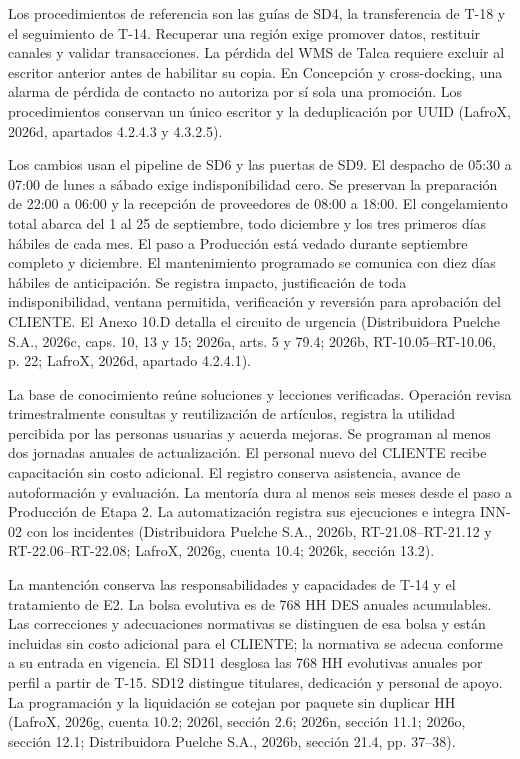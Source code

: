 Los procedimientos de referencia son las guías de SD4, la transferencia de T-18 y el seguimiento de T-14. Recuperar una región exige promover datos, restituir canales y validar transacciones. La pérdida del WMS de Talca requiere excluir al escritor anterior antes de habilitar su copia. En Concepción y cross-docking, una alarma de pérdida de contacto no autoriza por sí sola una promoción. Los procedimientos conservan un único escritor y la deduplicación por UUID (LafroX, 2026d, apartados 4.2.4.3 y 4.3.2.5).

Los cambios usan el pipeline de SD6 y las puertas de SD9. El despacho de 05:30 a 07:00 de lunes a sábado exige indisponibilidad cero. Se preservan la preparación de 22:00 a 06:00 y la recepción de proveedores de 08:00 a 18:00. El congelamiento total abarca del 1 al 25 de septiembre, todo diciembre y los tres primeros días hábiles de cada mes. El paso a Producción está vedado durante septiembre completo y diciembre. El mantenimiento programado se comunica con diez días hábiles de anticipación. Se registra impacto, justificación de toda indisponibilidad, ventana permitida, verificación y reversión para aprobación del CLIENTE. El Anexo 10.D detalla el circuito de urgencia (Distribuidora Puelche S.A., 2026c, caps. 10, 13 y 15; 2026a, arts. 5 y 79.4; 2026b, RT-10.05--RT-10.06, p. 22; LafroX, 2026d, apartado 4.2.4.1).

La base de conocimiento reúne soluciones y lecciones verificadas. Operación revisa trimestralmente consultas y reutilización de artículos, registra la utilidad percibida por las personas usuarias y acuerda mejoras. Se programan al menos dos jornadas anuales de actualización. El personal nuevo del CLIENTE recibe capacitación sin costo adicional. El registro conserva asistencia, avance de autoformación y evaluación. La mentoría dura al menos seis meses desde el paso a Producción de Etapa 2. La automatización registra sus ejecuciones e integra INN-02 con los incidentes (Distribuidora Puelche S.A., 2026b, RT-21.08--RT-21.12 y RT-22.06--RT-22.08; LafroX, 2026g, cuenta 10.4; 2026k, sección 13.2).

La mantención conserva las responsabilidades y capacidades de T-14 y el tratamiento de E2. La bolsa evolutiva es de 768 HH DES anuales acumulables. Las correcciones y adecuaciones normativas se distinguen de esa bolsa y están incluidas sin costo adicional para el CLIENTE; la normativa se adecua conforme a su entrada en vigencia. El SD11 desglosa las 768 HH evolutivas anuales por perfil a partir de T-15. SD12 distingue titulares, dedicación y personal de apoyo. La programación y la liquidación se cotejan por paquete sin duplicar HH (LafroX, 2026g, cuenta 10.2; 2026l, sección 2.6; 2026n, sección 11.1; 2026o, sección 12.1; Distribuidora Puelche S.A., 2026b, sección 21.4, pp. 37--38).

